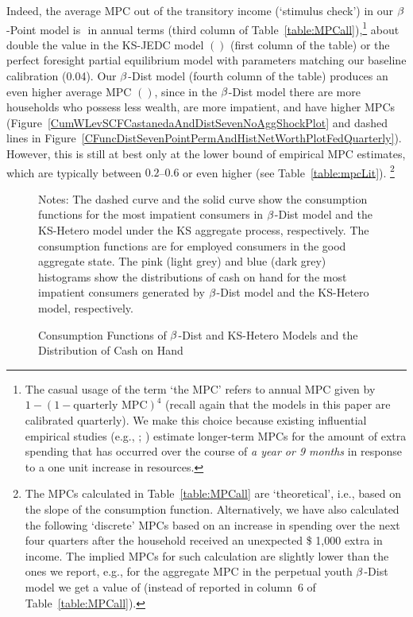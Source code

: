 \documentclass[12pt,titlepage]{econtex}
\begin{document}
Indeed, the average MPC out of the transitory income (`stimulus check') in our $\beta$-Point model is $  $ in annual terms (third column of Table~\ref{table:MPCall}),\footnote{The casual usage of the term `the MPC' refers to annual MPC given by $1-(1-\text{quarterly MPC})^4$ (recall again that the models in this paper are calibrated quarterly).  We make this choice because existing influential empirical studies (e.g., \citet{souleles:taxrefunds}; \citet{jpsTax}) estimate longer-term MPCs for the amount of extra spending that has occurred over the course of \emph{a year or 9 months} in response to a one unit increase in resources.}  about double the value in the KS-JEDC model $(  )$ (first column of the table) or the perfect foresight partial equilibrium model with parameters matching our baseline calibration (0.04). Our $\beta$-Dist model (fourth column of the table) produces an even higher average MPC $(  )$, since in the $\beta$-Dist model there are more households who possess less wealth, are more impatient, and have higher MPCs (Figure~\ref{CumWLevSCFCastanedaAndDistSevenNoAggShockPlot} and dashed lines in Figure~\ref{CFuncDistSevenPointPermAndHistNetWorthPlotFedQuarterly}). However, this is still at best only at the lower bound of empirical MPC estimates, which are typically between $0.2$--$0.6$ or even higher (see Table~\ref{table:mpcLit}).%
\footnote{The MPCs calculated in Table~\ref{table:MPCall} are `theoretical', i.e., based on the slope of the consumption function. Alternatively, we have also calculated the following `discrete' MPCs based on an increase in spending over the next four quarters after the household received an unexpected \$ 1,000 extra in income. The implied MPCs for such calculation are slightly lower than the ones we report, e.g., for the aggregate MPC in the perpetual youth $\beta$-Dist model we get a value of  (instead of  reported in column~6 of Table~\ref{table:MPCall}).}

\begin{figure}
\caption{Consumption Functions of  $\beta$-Dist and KS-Hetero Models and the Distribution of Cash on Hand}
\label{CFuncKSHeteroAndDistSevenAndHistDataKSHeteroPlot}
{\footnotesize Notes: The dashed curve and the solid curve show the consumption functions for the most impatient consumers in $\beta$-Dist model and the KS-Hetero model under the KS aggregate process, respectively. The consumption functions are for employed consumers in the good aggregate state. The pink (light grey) and blue (dark grey) histograms show the distributions of cash on hand for the most impatient consumers generated by $\beta$-Dist model and the KS-Hetero model, respectively.}
\end{figure}
\end{document}
